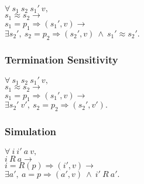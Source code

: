 $\forall\ s_1\ s_2\ s_1'\ v,$\\
$s_1\approx s_2 \rightarrow$\\
$s_1 =p_1\Rightarrow (s_1', v) \rightarrow$\\
$\exists s_2',\ s_2 =p_2\Rightarrow (s_2', v)\ \wedge\ s_1'\approx s_2'.$

\subsubsection*{Termination Sensitivity}

$\forall\ s_1\ s_2\ s_1'\ v,$\\
$s_1\approx s_2 \rightarrow$\\
$s_1 =p_1\Rightarrow (s_1', v) \rightarrow$\\
$\exists s_2'\ v',\ s_2 =p_2\Rightarrow (s_2', v').$

\subsubsection*{Simulation}

$\forall\ i\ i'\ a\ v,$\\
$i\ R\ a \rightarrow$\\
$i =R(p)\Rightarrow (i', v) \rightarrow$\\
$\exists a',\ a =p\Rightarrow (a', v)\ \wedge\ i'\ R\ a'.$

